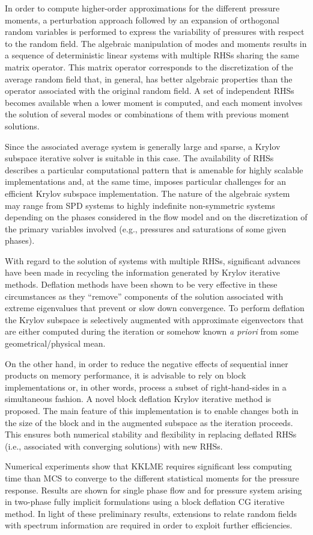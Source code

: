 \documentclass{report}
\begin{document}
In order to compute higher-order approximations for the different
pressure moments, a perturbation approach followed by an expansion of
orthogonal random variables is performed to express the variability of
pressures with respect to the random field. The algebraic manipulation of
modes and moments results in a sequence of deterministic linear systems
with multiple RHSs sharing the same matrix operator. This matrix operator
corresponds to the discretization of the average random field that, in
general, has better algebraic properties than the operator associated
with the original random field. A set of independent RHSs becomes
available when a lower moment is computed, and each moment involves the
solution of several modes or combinations of them with previous moment
solutions.

Since the associated average system is generally large and sparse, a
Krylov subspace iterative solver is suitable in this case. The
availability of RHSs describes a particular computational pattern that is
amenable for highly scalable implementations and, at the same time,
imposes particular challenges for an efficient Krylov subspace
implementation. The nature of the algebraic system may range from SPD
systems to highly indefinite non-symmetric systems depending on the
phases considered in the flow model and on the discretization of the
primary variables involved (e.g., pressures and saturations of some given
phases).

With regard to the solution of systems with multiple RHSs, significant
advances have been made in recycling the information generated by Krylov
iterative methods. Deflation methods have been shown to be very effective
in these circumstances as they ``remove'' components of the solution
associated with extreme eigenvalues that prevent or slow down
convergence. To perform deflation the Krylov subspace is selectively
augmented with approximate eigenvectors that are either computed during
the iteration or somehow known \emph{a priori} from some
geometrical/physical mean.

On the other hand, in order to reduce the negative effects of sequential
inner products on memory performance, it is advisable to rely on block
implementations or, in other words, process a subset of right-hand-sides
in a simultaneous fashion. A novel block deflation Krylov iterative
method is proposed. The main feature of this implementation is to enable
changes both in the size of the block and in the augmented subspace as
the iteration proceeds. This ensures both numerical stability and
flexibility in replacing deflated RHSs (i.e., associated with converging
solutions) with new RHSs.

Numerical experiments show that KKLME requires significant less computing
time than MCS to converge to the different statistical moments for the
pressure response. Results are shown for single phase flow and for
pressure system arising in two-phase fully implicit formulations using a
block deflation CG iterative method. In light of these preliminary
results, extensions to relate random fields with spectrum information are
required in order to exploit further efficiencies.
\end{document}
